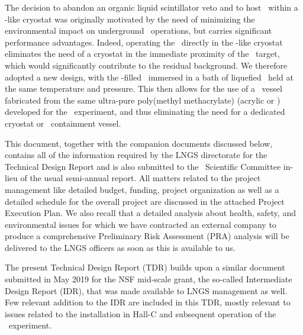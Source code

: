 The decision to abandon an organic liquid scintillator veto and to host \DSks\ within a \pDUNE-like cryostat was originally motivated by the need of minimizing the environmental impact on underground \LNGS\ operations, but carries significant performance advantages.  Indeed, operating the \TPC\ directly in the \pDUNE-like cryostat eliminates the need of a cryostat in the immediate proximity of the \UAr\ target, which would significantly contribute to the residual background.  We therefore adopted a new design, with the \UAr-filled \TPC\  immersed in a bath of liquefied \AAr\ held at the same temperature and pressure.  This then allows for the use of a \TPC\ vessel fabricated from the same ultra-pure poly(methyl methacrylate) (acrylic or \PMMA) developed for the \DEAP\ experiment, and thus eliminating the need for a dedicated cryostat or \UAr\ containment vessel. 


This document, together with the companion documents discussed below, contains all of the information required by the LNGS directorate for the Technical Design Report and is also submitted to the \LNGS\ Scientific Committee in-lieu of the usual semi-annual report. 
All matters related to the project management like detailed budget, funding, project organization as well as a detailed schedule for the overall project are discussed in the attached Project Execution Plan. We also recall that a detailed analysis about health, safety, and environmental issues for which we have contracted an external company to produce a comprehensive Preliminary Risk Assessment (PRA) analysis  will be delivered to the LNGS officers as soon as this is available to us.

The present Technical Design Report (TDR) builds upon a similar document submitted in May 2019 for the NSF mid-scale grant, the so-called Intermediate Design Report (IDR), that was made available to LNGS management as well. Few relevant addition to the IDR are included in this TDR, mostly relevant to issues related to the installation in Hall-C and subsequent operation of the \DSks\ experiment.

